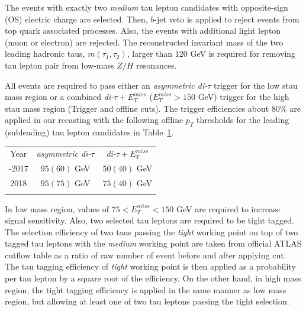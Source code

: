 \documentclass{ws-mpla}
\begin{document}

The events with exactly two \textit{medium} tau lepton candidates with opposite-sign (OS) electric charge are selected.
Then, $b$-jet veto is applied to reject events from top quark associated processes.
Also, the events with additional light lepton (muon or electron) are rejected.
The reconstructed invariant mass of the two leading {\color{blue}hadronic taus}, $m(\tau_1,\tau_2)$, larger than $120$ GeV is required for removing tau lepton pair from low-mass {\color{blue}$Z/H$ resonances}.

All events are required to pass either an \textit{asymmetric di-$\tau$} trigger for the low stau mass region or a combined \textit{di-$\tau +E^{miss}_T$} ($E^{miss}_T > 150$ GeV) trigger for the high stau mass region (Trigger and offline cuts).
The trigger efficiencies about $80\%$ are applied in our recasting with the following offline $p_T$ thresholds for the leading (subleading) tau lepton candidates in Table~\ref{tab:trig-eff}.

\begin{table}[h!]
  {\begin{tabular}{@{}c c c@{}} \toprule
  Year & \textit{asymmetric di-$\tau$} & \textit{di-$\tau +E^{miss}_T$} \\
  \colrule
 2015-2017 & $95(60)$ GeV & $50(40)$ GeV \\
 2018 & $95(75)$ GeV & $75(40)$ GeV \\ 
  \botrule
  \end{tabular}\label{tab:trig-eff} }
\end{table}

In {\color{blue}low mass} region, values of $75 < E^{miss}_T < 150$ GeV are required to increase signal sensitivity.
Also, two selected tau leptons are required to be tight tagged.
The selection efficiency of two taus passing the \textit{tight} working point on top of two {\color{blue}tagged tau leptons with the \textit{medium} working point are} taken from official ATLAS cutflow table as a ratio of raw number of event before and after applying cut. {\color{blue}The  tau tagging efficiency of \textit{tight} working point} is then applied as a probability per tau lepton by a square root of the efficiency.
On the other hand, in {\color{blue}high mass} region, the tight tagging efficiency is applied in the same manner as {\color{blue}low mass} region, but allowing at least one of two tau leptons passing the tight selection.
\end{document}
